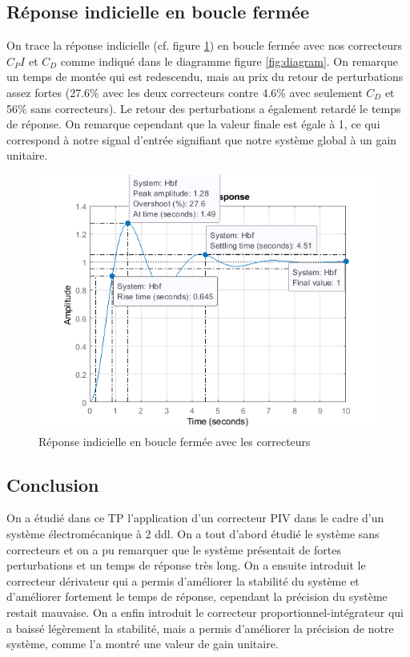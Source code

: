 \documentclass{article}
\begin{document}
\subsection{Réponse indicielle en boucle fermée}
On trace la réponse indicielle (cf. figure \ref{fig:step326}) en boucle fermée avec nos correcteurs $C_PI$ et $C_D$ comme indiqué dans le diagramme figure \ref{fig:diagram}.
On remarque un temps de montée qui est redescendu, mais au prix du retour de perturbations assez fortes (27.6\% avec les deux correcteurs contre 4.6\% avec seulement $C_D$ et 56\% sans correcteurs). Le retour des perturbations a également retardé le temps de réponse.
On remarque cependant que la valeur finale est égale à 1, ce qui correspond à notre signal d'entrée signifiant que notre système global à un gain unitaire.
\begin{figure}[h]
    \centering
    \includegraphics[width=1\linewidth]{step326.png}
    \caption{Réponse indicielle en boucle fermée avec les correcteurs}
    \label{fig:step326}
\end{figure}
\subsection{Conclusion}
On a étudié dans ce TP l'application d'un correcteur PIV dans le cadre d'un système électromécanique à 2 ddl. On a tout d'abord étudié le système sans correcteurs et on a pu remarquer que le système présentait de fortes perturbations et un temps de réponse très long. On a ensuite introduit le correcteur dérivateur qui a permis d'améliorer la stabilité du système et d'améliorer fortement le temps de réponse, cependant la précision du système restait mauvaise. On a enfin introduit le correcteur proportionnel-intégrateur qui a baissé légèrement la stabilité, mais a permis d'améliorer la précision de notre système, comme l'a montré une valeur de gain unitaire.
\end{document}
